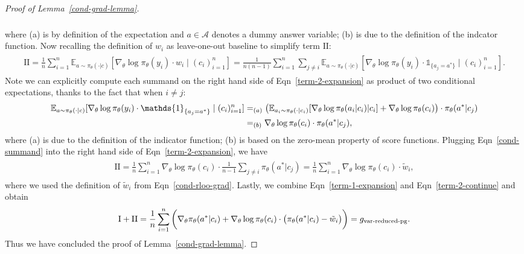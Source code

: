 \documentclass{article}
\theoremstyle{definition}
\begin{document}
\begin{appendix}
\begin{proof}[Proof of Lemma~\ref{cond-grad-lemma}]
\begin{eqnarray}
\begin{split}
\end{split}
\end{eqnarray}
where (a) is by definition of the expectation and $a\in\mathcal{A}$ denotes a dummy answer variable; (b) is due to the definition of the indcator function.
Now recalling the definition of $w_i$ as leave-one-out baseline to simplify term $\text{II}$:
\begin{eqnarray}
\begin{split}
\label{term-2-expansion}
\text{II} = \frac{1}{n}\sum_{i=1}^n \mathbb{E}_{a\sim \pi_\theta(\cdot|c)}\left[\nabla_\theta\log\pi_\theta(y_i)\cdot w_i \;|\; (c_i)_{i=1}^n\right]
= \frac{1}{n(n-1)}\sum_{i=1}^n \sum_{j\neq i}\mathbb{E}_{a\sim \pi_\theta(\cdot|c)}\left[\nabla_\theta\log\pi_\theta(y_i)\cdot \mathds{1}_{\{a_j=a^*\}} \; | \;  (c_i)_{i=1}^n\right].
\end{split}
\end{eqnarray}
Note we can explicitly compute each summand on the right hand side of Eqn~\eqref{term-2-expansion} as product of two conditional expectations, thanks to the fact that when $i\neq j$:
\begin{eqnarray}
\begin{split}
\label{cond-summand}
\mathbb{E}_{a\sim \pi_\theta(\cdot|c)}[\nabla_\theta\log\pi_\theta(y_i)\cdot \mathds{1}_{\{a_j=a^*\}} \; | \;  (c_i)_{i=1}^n] 
&=_{(a)} \big(\mathbb{E}_{a_i\sim\pi_\theta(\cdot|c_i)} [\nabla_\theta\log\pi_\theta(a_i | c_i) | c_i] + \nabla_\theta\log\pi_\theta(c_i)\big{)} \cdot \pi_\theta(a^*|c_j) \\
&=_{(b)} \nabla_\theta\log\pi_\theta(c_i) \cdot  \pi_\theta(a^*|c_j),
\end{split}
\end{eqnarray}
where (a) is due to the definition of the indicator function; (b) is based on the zero-mean property of score functions. Plugging Eqn~\eqref{cond-summand} into the right hand side of Eqn~\eqref{term-2-expansion}, we have
\begin{eqnarray}
\begin{split}
\label{term-2-continue}
\text{II} 
= \frac{1}{n}\sum_{i=1}^n \nabla_\theta\log\pi_\theta(c_i)\cdot \frac{1}{n-1}\sum_{j\neq i}\pi_\theta(a^*|c_j)
= \frac{1}{n}\sum_{i=1}^n \nabla_\theta\log\pi_\theta(c_i) \cdot \tilde{w}_i,
\end{split}
\end{eqnarray}
where we used the definition of $\tilde{w}_i$ from Eqn~\eqref{cond-rloo-grad}. Lastly, we combine Eqn~\eqref{term-1-expansion} and Eqn~\eqref{term-2-continue} and obtain
\begin{eqnarray}
\begin{split}
\text{I} + \text{II} = \frac{1}{n}\sum_{i=1}^n \bigg{(}\nabla_\theta\pi_\theta(a^* | c_i) + \nabla_\theta\log\pi_\theta(c_i) \cdot \big{(}\pi_\theta(a^*|c_i) - \tilde{w}_i \big{)}\bigg{)} = g_\text{var-reduced-pg}.
\end{split}
\end{eqnarray}
Thus we have concluded the proof of Lemma~\ref{cond-grad-lemma}.
\end{proof}


\end{appendix}
\end{document}
